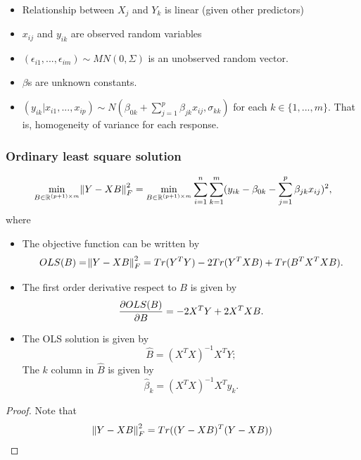 \begin{refsection}
\begin{assumption}\hfill
\begin{itemize}
	\item Relationship between $X_j$ and $Y_k$ is linear (given other predictors)
	\item $x_{ij}$ and $y_{ik}$ are observed random variables
	\item $(\epsilon_{i1},...,\epsilon_{im})\sim MN(0, \Sigma)$ is an unobserved random vector. 
	\item $\beta$s are unknown constants. 
	\item $(y_{ik}|x_{i1},...,x_{ip})\sim N(\beta_{0k} + \sum_{j=1}^p \beta_{jk}x_{ij}, \sigma_{kk})$ for each $k\in \{1,...,m\}$. That is, homogeneity of variance for each response. 
\end{itemize}	
\end{assumption}


\subsubsection{Ordinary least square solution}


\begin{theorem}

$$\min_{B\in \mathbb{R}^{(p+1)\times m}} \norm{Y - XB}^2_F = \min_{B\in \mathbb{R}^{(p+1)\times m}} \sum_{i=1}^n \sum_{k=1}^m (y_{ik} - \beta_{0k} - \sum_{j=1}^p \beta_{jk}x_{ij})^2,$$
where
\begin{itemize}
	\item The objective function can be written by
	$$OLS(B) = \norm{Y - XB}^2_F = Tr(Y^TY) - 2Tr(Y^TXB) + Tr(B^TX^TXB).$$
	\item The first order derivative respect to $B$ is given by
	$$\frac{\partial OLS(B)}{\partial B} = -2X^TY + 2X^TXB.$$
	\item The OLS solution is given by
	$$\hat{B} = (X^TX)^{-1}X^TY;$$
	The $k$ column in $\hat{B}$ is given by
	$$\hat{\beta}_k = (X^TX)^{-1}X^Ty_k.$$
\end{itemize}	
\end{theorem}
\begin{proof}
Note that
$$\norm{Y - XB}^2_F = Tr((Y - XB)^T(Y-XB))$$
\end{proof}




\end{refsection}
